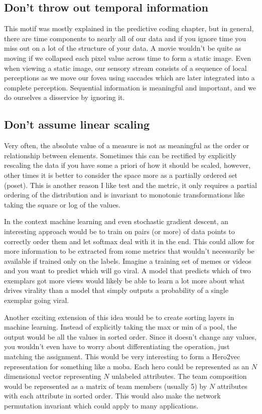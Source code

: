\subsection{Don't throw out temporal information}
This motif was mostly explained in the predictive coding chapter, but in general, there are time components to nearly all of our data and if you ignore time you miss out on a lot of the structure of your data. A movie wouldn't be quite as moving if we collapsed each pixel value across time to form a static image. Even when viewing a static image, our sensory stream consists of a sequence of local perceptions as we move our fovea using saccades which are later integrated into a complete perception. Sequential information is meaningful and important, and we do ourselves a disservice by ignoring it.

\subsection{Don't assume linear scaling}
Very often, the absolute value of a measure is not as meaningful as the order or relationship between elements. Sometimes this can be rectified by explicitly rescaling the data if you have some a priori of how it should be scaled, however, other times it is better to consider the space more as a partially ordered set (poset). This is another reason I like \KS test and the \KS metric, it only requires a partial ordering of the distribution and is invariant to monotonic transformations like taking the square or log of the values.

In the context machine learning and even stochastic gradient descent, an interesting approach would be to train on pairs (or more) of data points to correctly order them and let softmax deal with it in the end. This could allow for more information to be extracted from some metrics that wouldn't necessarily be available if trained only on the labels. Imagine a training set of memes or videos and you want to predict which will go viral. A model that predicts which of two exemplars got more views would likely be able to learn a lot more about what drives virality than a model that simply outputs a probability of a single exemplar going viral.

Another exciting extension of this idea would be to create sorting layers in machine learning. Instead of explicitly taking the max or min of a pool, the output would be all the values in sorted order. Since it doesn't change any values, you wouldn't even have to worry about differentiating the operation, just matching the assignment. This would be very interesting to form a Hero2vec representation for something like a moba. Each hero could be represented as an $N$ dimensional vector representing $N$ unlabeled attributes. The team composition would be represented as a matrix of team members (usually 5) by $N$ attributes with each attribute in sorted order. This would also make the network permutation invariant which could apply to many applications.


